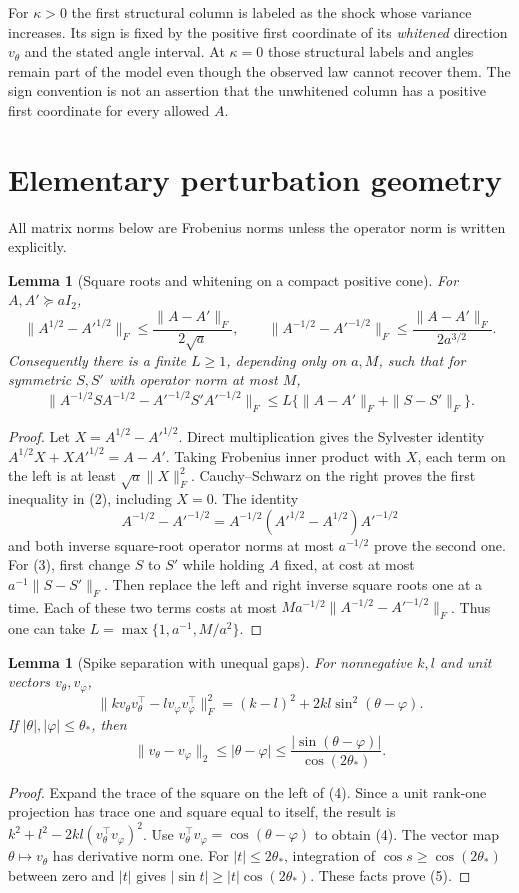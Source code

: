 \documentclass[11pt]{article}
\newtheorem{lemma}[theorem]{Lemma}
\theoremstyle{definition}
\begin{document}
For $\kappa>0$ the first structural column is labeled as the shock
whose variance increases. Its sign is fixed by the positive first
coordinate of its \emph{whitened} direction $v_\theta$ and the stated
angle interval. At $\kappa=0$ those structural labels and angles remain
part of the model even though the observed law cannot recover them.
The sign convention is not an assertion that the unwhitened column has
a positive first coordinate for every allowed $A$.

\section*{Elementary perturbation geometry}
All matrix norms below are Frobenius norms unless the operator norm is
written explicitly.

\begin{lemma}[Square roots and whitening on a compact positive cone]
For $A,A'\succeq aI_2$,
\[
 \|A^{1/2}-A'^{1/2}\|_F
       \le\frac{\|A-A'\|_F}{2\sqrt a},\qquad
 \|A^{-1/2}-A'^{-1/2}\|_F
       \le\frac{\|A-A'\|_F}{2a^{3/2}}.              \tag{2}
\]
Consequently there is a finite $L\ge1$, depending only on $a,M$, such
that for symmetric $S,S'$ with operator norm at most $M$,
\[
 \|A^{-1/2}SA^{-1/2}-A'^{-1/2}S'A'^{-1/2}\|_F
       \le L\{\|A-A'\|_F+\|S-S'\|_F\}.             \tag{3}
\]
\end{lemma}
\begin{proof}
Let $X=A^{1/2}-A'^{1/2}$. Direct multiplication gives the Sylvester
identity $A^{1/2}X+XA'^{1/2}=A-A'$.
Taking Frobenius inner product with $X$, each term on the left is at
least $\sqrt a\|X\|_F^2$. Cauchy--Schwarz on the right proves the
first inequality in (2), including $X=0$.
The identity
\[
 A^{-1/2}-A'^{-1/2}
 =A^{-1/2}(A'^{1/2}-A^{1/2})A'^{-1/2}
\]
and both inverse square-root operator norms at most $a^{-1/2}$
prove the second one.
For (3), first change $S$ to $S'$ while holding $A$ fixed, at cost
at most $a^{-1}\|S-S'\|_F$. Then replace the left and right inverse
square roots one at a time. Each of these two terms costs at most
$M a^{-1/2}\|A^{-1/2}-A'^{-1/2}\|_F$.
Thus one can take $L=\max\{1,a^{-1},M/a^2\}$.
\end{proof}

\begin{lemma}[Spike separation with unequal gaps]
For nonnegative $k,l$ and unit vectors $v_\theta,v_\varphi$,
\[
 \|k v_\theta v_\theta^\top-l v_\varphi v_\varphi^\top\|_F^2
 =(k-l)^2+2kl\sin^2(\theta-\varphi).                 \tag{4}
\]
If $|\theta|,|\varphi|\le\theta_*$, then
\[
 \|v_\theta-v_\varphi\|_2
 \le|\theta-\varphi|
 \le\frac{|\sin(\theta-\varphi)|}{\cos(2\theta_*)}. \tag{5}
\]
\end{lemma}
\begin{proof}
Expand the trace of the square on the left of (4). Since a unit rank-one
projection has trace one and square equal to itself, the result is
$k^2+l^2-2kl(v_\theta^\top v_\varphi)^2$.
Use $v_\theta^\top v_\varphi=\cos(\theta-\varphi)$ to obtain (4).
The vector map $\theta\mapsto v_\theta$ has derivative norm one.
For $|t|\le2\theta_*$, integration of $\cos s\ge\cos(2\theta_*)$
between zero and $|t|$ gives $|\sin t|\ge|t|\cos(2\theta_*)$.
These facts prove (5).
\end{proof}
\end{document}
